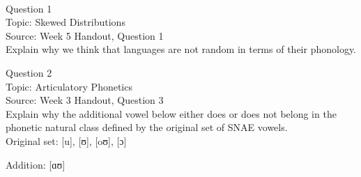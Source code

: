 \documentclass[12pt]{article}
\begin{document}
\newpage

\begin{center}
\textbf{{\color{red}{\HUGE END OF EXAM}}}\\

\end{center}
\newpage

\begin{center}
\textbf{{\color{blue}{\HUGE START OF EXAM\\}}}

\textbf{{\color{blue}{\HUGE Student ID: 99594\\}}}

\textbf{{\color{blue}{\HUGE 4:50\\}}}

\end{center}
\newpage

{\large Question 1}\\

Topic: Skewed Distributions\\
Source: Week 5 Handout, Question 1\\

Explain why we think that languages are not random in terms of their phonology.\\


\newpage

{\large Question 2}\\

Topic: Articulatory Phonetics\\
Source: Week 3 Handout, Question 3\\

Explain why the additional vowel below either does or does not belong in the phonetic natural class defined by the original set of SNAE vowels.\\

Original set: {[u]}, {[ʊ]}, {[oʊ]}, {[ɔ]}

Addition: {[ɑʊ]}


\newpage

\begin{center}
\textbf{{\color{red}{\HUGE END OF EXAM}}}\\

\end{center}
\newpage
\end{document}
